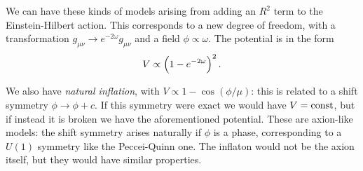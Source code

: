 \documentclass[main.tex]{subfiles}
\begin{document}
We can have these kinds of models arising from adding an \(R^2\) term to the Einstein-Hilbert action. 
This corresponds to a new degree of freedom, with a transformation \(g_{\mu \nu } \to e^{-2 \omega } g_{\mu \nu }\) and a field \(\phi  \propto \omega \). 
The potential is in the form 
%
\begin{align}
V \propto \qty(1 - e^{-2 \omega })^2
\,.
\end{align}

We also have \emph{natural inflation}, with \(V \propto 1 - \cos(\phi / \mu )\): this is related to a shift symmetry \(\phi \to \phi + c\). 
If this symmetry were exact we would have \(V = \text{const}\), but if instead it is broken we have the aforementioned potential. 
These are axion-like models: the shift symmetry arises naturally if \(\phi \) is a phase, corresponding to a \(U(1)\) symmetry like the Peccei-Quinn one.
The inflaton would not be the axion itself, but they would have similar properties. 
\end{document}
